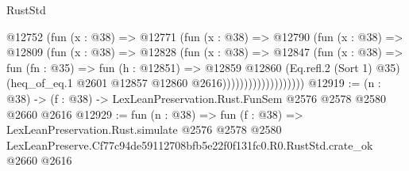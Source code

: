 \begin{lexlean}{RustStd}
\begin{coremodule}
                          @12752
                            (fun (x : @38) =>
                            @12771
                              (fun (x : @38) =>
                              @12790
                                (fun (x : @38) =>
                                @12809
                                  (fun (x : @38) =>
                                  @12828
                                    (fun (x : @38) =>
                                    @12847
                                      (fun (x : @38) =>
                                      fun (fn : @35) =>
                                      fun (h : @12851) =>
                                      @12859
                                        @12860
                                        (Eq.refl.{2} (Sort 1) @35)
                                        (heq_of_eq.{1} @2601 @12857 @12860 @2616)))))))))))))))))))
@12919 := (n : @38) -> (f : @38) -> LexLeanPreservation.Rust.FunSem @2576 @2578 @2580 @2660 @2616
@12929 := fun (n : @38) =>
  fun (f : @38) =>
  LexLeanPreservation.Rust.simulate
    @2576
    @2578
    @2580
    LexLeanPreserve.Cf77c94de59112708bfb5e22f0f131fc0.R0.RustStd.crate_ok
    @2660
    @2616
\end{coremodule}
\end{lexlean}
